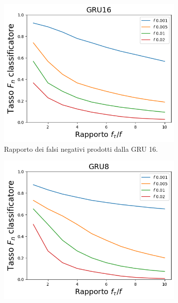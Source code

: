 \documentclass[../../main.tex]{subfiles}
\begin{document}
    \begin{figure}[H]
        \centering
        \begin{subfigure}[b]{0.32\textwidth}
            \centering
            \includegraphics[width = \textwidth]{immagini/7/SLBF/GRU16_FNR.png}
            \caption{Rapporto dei falsi negativi prodotti dalla GRU 16.}
            \label{fig:SLBFFNR_GRU16}
        \end{subfigure}
        \begin{subfigure}[b]{0.32\textwidth}
            \centering
            \includegraphics[width = \textwidth]{immagini/7/SLBF/GRU8_FNR.png}

\end{subfigure}
\end{figure}
\end{document}
